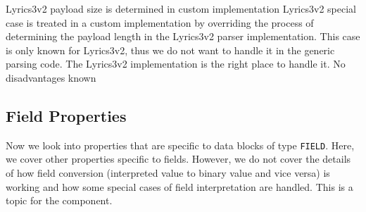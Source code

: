 {%
Lyrics3v2 payload size is determined in custom implementation
}
{%
Lyrics3v2 special case is treated in a custom implementation by overriding the process of determining the payload length in the Lyrics3v2 parser implementation.
}
{%
This case is only known for Lyrics3v2, thus we do not want to handle it in the generic parsing code. The Lyrics3v2 implementation is the right place to handle it.
}
{%
No disadvantages known
}

\subsection{Field Properties}%
\label{sec:FieldProperties}%

Now we look into properties that are specific to data blocks of type \texttt{FIELD}. Here, we cover other properties specific to fields. However, we do not cover the details of how field conversion (interpreted value to binary value and vice versa) is working and how some special cases of field interpretation are handled. This is a topic for the \COMPdataPartManagement{} component. 

